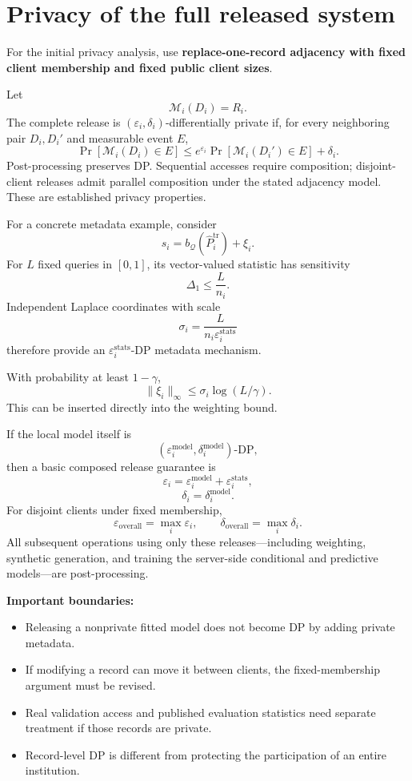 \documentclass[11pt,a4paper]{article}
\begin{document}
\section{Privacy of the full released system}
For the initial privacy analysis, use \textbf{replace-one-record adjacency with fixed client membership and fixed public client sizes}.

Let
\[
\mathcal M_i(D_i)=R_i.
\]
The complete release is $(\varepsilon_i,\delta_i)$-differentially private if, for every neighboring pair $D_i,D_i'$ and measurable event $E$,
\[
\boxed{\Pr[\mathcal M_i(D_i)\in E]
\leq e^{\varepsilon_i}\Pr[\mathcal M_i(D_i')\in E]+\delta_i.}
\]
Post-processing preserves DP. Sequential accesses require composition; disjoint-client releases admit parallel composition under the stated adjacency model. These are established privacy properties.\cite{dp}

For a concrete metadata example, consider
\[
s_i=b_{\mathcal Q}(\widehat P_i^{\mathrm{tr}})+\xi_i.
\]
For $L$ fixed queries in $[0,1]$, its vector-valued statistic has sensitivity
\[
\Delta_1\leq\frac{L}{n_i}.
\]
Independent Laplace coordinates with scale
\[
\boxed{\sigma_i=\frac{L}{n_i\varepsilon_i^{\mathrm{stats}}}}
\]
therefore provide an $\varepsilon_i^{\mathrm{stats}}$-DP metadata mechanism.

With probability at least $1-\gamma$,
\[
\|\xi_i\|_\infty\leq\sigma_i\log(L/\gamma).
\]
This can be inserted directly into the weighting bound.

If the local model itself is
\[
(\varepsilon_i^{\mathrm{model}},\delta_i^{\mathrm{model}})\text{-DP},
\]
then a basic composed release guarantee is
\[
\varepsilon_i=\varepsilon_i^{\mathrm{model}}+\varepsilon_i^{\mathrm{stats}},
\]
\[
\delta_i=\delta_i^{\mathrm{model}}.
\]
For disjoint clients under fixed membership,
\[
\varepsilon_{\mathrm{overall}}=\max_i\varepsilon_i,
\qquad\delta_{\mathrm{overall}}=\max_i\delta_i.
\]
All subsequent operations using only these releases---including weighting, synthetic generation, and training the server-side conditional and predictive models---are post-processing.

\textbf{Important boundaries:}
\begin{itemize}
\item Releasing a nonprivate fitted model does not become DP by adding private metadata.
\item If modifying a record can move it between clients, the fixed-membership argument must be revised.
\item Real validation access and published evaluation statistics need separate treatment if those records are private.
\item Record-level DP is different from protecting the participation of an entire institution.
\end{itemize}
\end{document}
